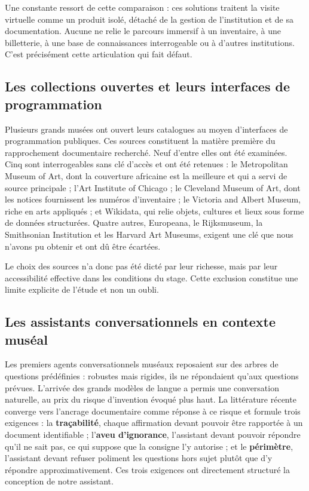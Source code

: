 Une constante ressort de cette comparaison : ces solutions traitent la visite
virtuelle comme un produit isolé, détaché de la gestion de l'institution et de
sa documentation. Aucune ne relie le parcours immersif à un inventaire, à une
billetterie, à une base de connaissances interrogeable ou à d'autres
institutions. C'est précisément cette articulation qui fait défaut.

\subsection{Les collections ouvertes et leurs interfaces de programmation}

Plusieurs grands musées ont ouvert leurs catalogues au moyen d'interfaces de
programmation publiques. Ces sources constituent la matière première du
rapprochement documentaire recherché. Neuf d'entre elles ont été examinées.
Cinq sont interrogeables sans clé d'accès et ont été retenues : le Metropolitan
Museum of Art, dont la couverture africaine est la meilleure et qui a servi de
source principale ; l'Art Institute of Chicago ; le Cleveland Museum of Art,
dont les notices fournissent les numéros d'inventaire ; le Victoria and Albert
Museum, riche en arts appliqués ; et Wikidata, qui relie objets, cultures et
lieux sous forme de données structurées. Quatre autres, Europeana, le
Rijksmuseum, la Smithsonian Institution et les Harvard Art Museums, exigent une
clé que nous n'avons pu obtenir et ont dû être écartées.

Le choix des sources n'a donc pas été dicté par leur richesse, mais par leur
accessibilité effective dans les conditions du stage. Cette exclusion constitue
une limite explicite de l'étude et non un oubli.

\subsection{Les assistants conversationnels en contexte muséal}

Les premiers agents conversationnels muséaux reposaient sur des arbres de
questions prédéfinies : robustes mais rigides, ils ne répondaient qu'aux
questions prévues. L'arrivée des grands modèles de langue a permis une
conversation naturelle, au prix du risque d'invention évoqué plus haut. La
littérature récente converge vers l'ancrage documentaire comme réponse à ce
risque et formule trois exigences : la \textbf{traçabilité}, chaque affirmation
devant pouvoir être rapportée à un document identifiable ; l'\textbf{aveu
d'ignorance}, l'assistant devant pouvoir répondre qu'il ne sait pas, ce qui
suppose que la consigne l'y autorise ; et le \textbf{périmètre}, l'assistant
devant refuser poliment les questions hors sujet plutôt que d'y répondre
approximativement. Ces trois exigences ont directement structuré la conception
de notre assistant.
